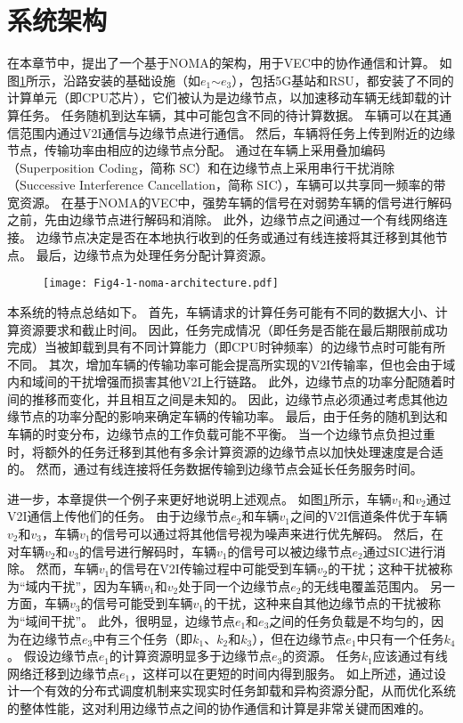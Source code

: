 \section{系统架构}\label{section 4-2}

在本章节中，提出了一个基于NOMA的架构，用于VEC中的协作通信和计算。
如图\ref{fig 4-1}所示，沿路安装的基础设施（如$e_1$$\sim$$e_3$），包括5G基站和RSU，都安装了不同的计算单元（即CPU芯片），它们被认为是边缘节点，以加速移动车辆无线卸载的计算任务。
任务随机到达车辆，其中可能包含不同的待计算数据。
车辆可以在其通信范围内通过V2I通信与边缘节点进行通信。
然后，车辆将任务上传到附近的边缘节点，传输功率由相应的边缘节点分配。
通过在车辆上采用叠加编码（Superposition Coding，简称 SC）和在边缘节点上采用串行干扰消除（Successive Interference Cancellation，简称 SIC）\cite{khan2021noma}，车辆可以共享同一频率的带宽资源。
在基于NOMA的VEC中，强势车辆的信号在对弱势车辆的信号进行解码之前，先由边缘节点进行解码和消除。
此外，边缘节点之间通过一个有线网络连接。
边缘节点决定是否在本地执行收到的任务或通过有线连接将其迁移到其他节点。
最后，边缘节点为处理任务分配计算资源。

\begin{figure}[h]
\centering
  \texttt{[image: Fig4-1-noma-architecture.pdf]}
  \label{fig 4-1}
\end{figure} 

本系统的特点总结如下。
首先，车辆请求的计算任务可能有不同的数据大小、计算资源要求和截止时间。
因此，任务完成情况（即任务是否能在最后期限前成功完成）当被卸载到具有不同计算能力（即CPU时钟频率）的边缘节点时可能有所不同。
其次，增加车辆的传输功率可能会提高所实现的V2I传输率，但也会由于域内和域间的干扰增强而损害其他V2I上行链路。
此外，边缘节点的功率分配随着时间的推移而变化，并且相互之间是未知的。
因此，边缘节点必须通过考虑其他边缘节点的功率分配的影响来确定车辆的传输功率。
最后，由于任务的随机到达和车辆的时变分布，边缘节点的工作负载可能不平衡。
当一个边缘节点负担过重时，将额外的任务迁移到其他有多余计算资源的边缘节点以加快处理速度是合适的。
然而，通过有线连接将任务数据传输到边缘节点会延长任务服务时间。

进一步，本章提供一个例子来更好地说明上述观点。
如图\ref{fig 4-1}所示，车辆$v_1$和$v_2$通过V2I通信上传他们的任务。
由于边缘节点$e_2$和车辆$v_1$之间的V2I信道条件优于车辆$v_2$和$v_3$，车辆$v_1$的信号可以通过将其他信号视为噪声来进行优先解码。
然后，在对车辆$v_2$和$v_3$的信号进行解码时，车辆$v_1$的信号可以被边缘节点$e_2$通过SIC进行消除。
然而，车辆$v_1$的信号在V2I传输过程中可能受到车辆$v_2$的干扰；这种干扰被称为“域内干扰”，因为车辆$v_1$和$v_2$处于同一个边缘节点$e_2$的无线电覆盖范围内。
另一方面，车辆$v_3$的信号可能受到车辆$v_1$的干扰，这种来自其他边缘节点的干扰被称为“域间干扰”。
此外，很明显，边缘节点$e_1$和$e_3$之间的任务负载是不均匀的，因为在边缘节点$e_3$中有三个任务（即$k_1$、$k_2$和$k_3$），但在边缘节点$e_1$中只有一个任务$k_4$。
假设边缘节点$e_1$的计算资源明显多于边缘节点$e_3$的资源。
任务$k_1$应该通过有线网络迁移到边缘节点$e_1$，这样可以在更短的时间内得到服务。
如上所述，通过设计一个有效的分布式调度机制来实现实时任务卸载和异构资源分配，从而优化系统的整体性能，这对利用边缘节点之间的协作通信和计算是非常关键而困难的。

